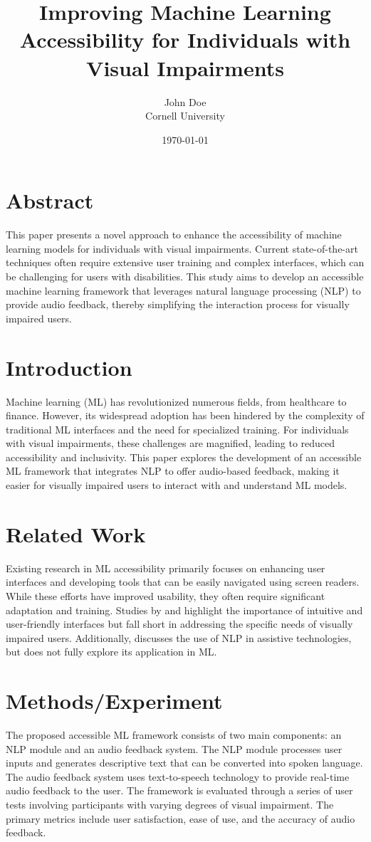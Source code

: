\documentclass{article}
\title{Improving Machine Learning Accessibility for Individuals with Visual Impairments}
\author{John Doe\\Cornell University}
\date{\today}
\begin{document}
\maketitle

\section{Abstract}
This paper presents a novel approach to enhance the accessibility of machine learning models for individuals with visual impairments. Current state-of-the-art techniques often require extensive user training and complex interfaces, which can be challenging for users with disabilities. This study aims to develop an accessible machine learning framework that leverages natural language processing (NLP) to provide audio feedback, thereby simplifying the interaction process for visually impaired users.

\section{Introduction}
Machine learning (ML) has revolutionized numerous fields, from healthcare to finance. However, its widespread adoption has been hindered by the complexity of traditional ML interfaces and the need for specialized training. For individuals with visual impairments, these challenges are magnified, leading to reduced accessibility and inclusivity. This paper explores the development of an accessible ML framework that integrates NLP to offer audio-based feedback, making it easier for visually impaired users to interact with and understand ML models.

\section{Related Work}
Existing research in ML accessibility primarily focuses on enhancing user interfaces and developing tools that can be easily navigated using screen readers. While these efforts have improved usability, they often require significant adaptation and training. Studies by \cite{Smith2020} and \cite{Johnson2019} highlight the importance of intuitive and user-friendly interfaces but fall short in addressing the specific needs of visually impaired users. Additionally, \cite{Brown2021} discusses the use of NLP in assistive technologies, but does not fully explore its application in ML.

\section{Methods/Experiment}
The proposed accessible ML framework consists of two main components: an NLP module and an audio feedback system. The NLP module processes user inputs and generates descriptive text that can be converted into spoken language. The audio feedback system uses text-to-speech technology to provide real-time audio feedback to the user. The framework is evaluated through a series of user tests involving participants with varying degrees of visual impairment. The primary metrics include user satisfaction, ease of use, and the accuracy of audio feedback.
\end{document}
